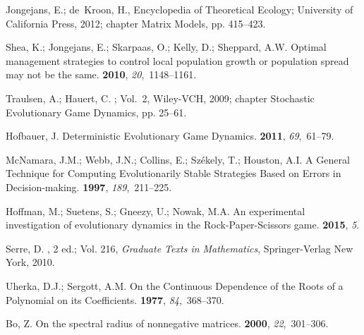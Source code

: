 \documentclass[journal,article,accept,oneauthor,pdftex,10pt,a4paper,games]{mdpi}
\begin{document}
\begin{thebibliography}{999}
Jongejans, E.; de~Kroon, H., Encyclopedia of Theoretical Ecology; University of
  California Press,  2012; chapter Matrix Models, pp. 415--423.

Shea, K.; Jongejans, E.; Skarpaas, O.; Kelly, D.; Sheppard, A.W.
\newblock Optimal management strategies to control local population growth or
  population spread may not be the same.
 {\bf 2010}, {\em 20},~1148–1161.

Traulsen, A.; Hauert, C.
; Vol.~2,
  Wiley-VCH,  2009; chapter Stochastic Evolutionary Game Dynamics, pp. 25--61.

Hofbauer, J.
\newblock Deterministic Evolutionary Game Dynamics.
 {\bf 2011}, {\em
  69},~61--79.

McNamara, J.M.; Webb, J.N.; Collins, E.; Székely, T.; Houston, A.I.
\newblock A General Technique for Computing Evolutionarily Stable Strategies
  Based on Errors in Decision-making.
 {\bf 1997}, {\em 189},~211--225.

Hoffman, M.; Suetens, S.; Gneezy, U.; Nowak, M.A.
\newblock An experimental investigation of evolutionary dynamics in the
  Rock-Paper-Scissors game.
 {\bf 2015}, {\em 5}.

Serre, D.
, 2 ed.; Vol. 216, {\em
  Graduate Texts in Mathematics}, Springer-Verlag New York,  2010.

Uherka, D.J.; Sergott, A.M.
\newblock On the Continuous Dependence of the Roots of a Polynomial on its
  Coefficients.
 {\bf 1977}, {\em
  84},~368--370.

Bo, Z.
\newblock On the spectral radius of nonnegative matrices.
 {\bf 2000}, {\em
  22},~301--306.

\end{thebibliography}
\end{document}
